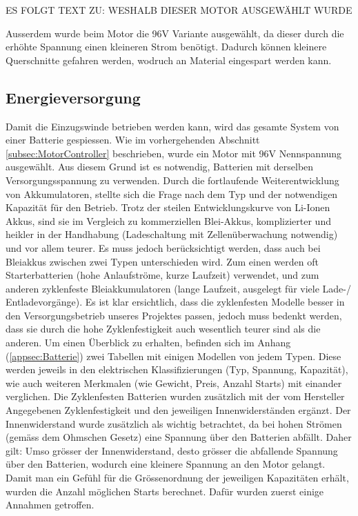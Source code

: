 ES FOLGT TEXT ZU: WESHALB DIESER MOTOR AUSGEWÄHLT WURDE


Ausserdem wurde beim Motor die 96V Variante ausgewählt, da dieser durch die erhöhte Spannung einen kleineren Strom benötigt. Dadurch können kleinere Querschnitte gefahren werden, wodruch an Material eingespart werden kann.

\subsection{Energieversorgung}\label{subsec:Energieversorgung}

Damit die Einzugswinde betrieben werden kann, wird das gesamte System von einer Batterie gespiessen. Wie im vorhergehenden Abschnitt \ref{subsec:MotorController} beschrieben, wurde ein Motor mit 96V Nennspannung ausgewählt. Aus diesem Grund ist es notwendig, Batterien mit derselben Versorgungsspannung zu verwenden. Durch die fortlaufende Weiterentwicklung von Akkumulatoren, stellte sich die Frage nach dem Typ und der notwendigen Kapazität für den Betrieb. Trotz der steilen Entwicklungskurve von Li-Ionen Akkus, sind sie im Vergleich zu kommerziellen Blei-Akkus, komplizierter und heikler in der Handhabung (Ladeschaltung mit Zellenüberwachung notwendig) und vor allem teurer. Es muss jedoch berücksichtigt werden, dass auch bei Bleiakkus zwischen zwei Typen unterschieden wird. Zum einen werden oft Starterbatterien (hohe Anlaufströme, kurze Laufzeit) verwendet, und zum anderen zyklenfeste Bleiakkumulatoren (lange Laufzeit, ausgelegt für viele Lade-/ Entladevorgänge). Es ist klar ersichtlich, dass die zyklenfesten Modelle besser in den Versorgungsbetrieb unseres Projektes passen, jedoch muss bedenkt werden, dass sie durch die hohe Zyklenfestigkeit auch wesentlich teurer sind als die anderen. Um einen Überblick zu erhalten, befinden sich im Anhang (\ref{appsec:Batterie}) zwei Tabellen mit einigen Modellen von jedem Typen. Diese werden jeweils in den elektrischen Klassifizierungen (Typ, Spannung, Kapazität), wie auch weiteren Merkmalen (wie Gewicht, Preis, Anzahl Starts) mit einander verglichen. Die Zyklenfesten Batterien wurden zusätzlich mit der vom Hersteller Angegebenen Zyklenfestigkeit und den jeweiligen Innenwiderständen ergänzt. Der Innenwiderstand wurde zusätzlich als wichtig betrachtet, da bei hohen Strömen (gemäss dem Ohmschen Gesetz) eine Spannung über den Batterien abfällt. Daher gilt: Umso grösser der Innenwiderstand, desto grösser die abfallende Spannung über den Batterien, wodurch eine kleinere Spannung an den Motor gelangt.
Damit man ein Gefühl für die Grössenordnung der jeweiligen Kapazitäten erhält, wurden die Anzahl möglichen Starts berechnet. Dafür wurden zuerst einige Annahmen getroffen.

